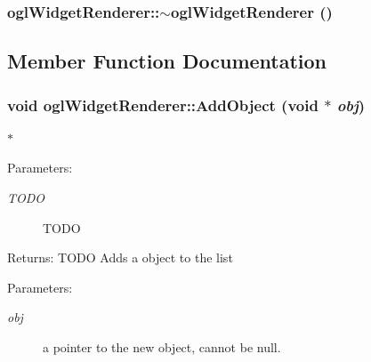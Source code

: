 \hypertarget{classogl_widget_renderer_b4db2e05b4cf4e0f95a93d0795ea33ad}{
\subsubsection[{$\sim$oglWidgetRenderer}]{\setlength{\rightskip}{0pt plus 5cm}oglWidgetRenderer::$\sim$oglWidgetRenderer ()}}
\label{classogl_widget_renderer_b4db2e05b4cf4e0f95a93d0795ea33ad}




\subsection{Member Function Documentation}
\hypertarget{classogl_widget_renderer_c9fcd00dffcc0a44a9bfff90811e586e}{
\subsubsection[{AddObject}]{\setlength{\rightskip}{0pt plus 5cm}void oglWidgetRenderer::AddObject (void $\ast$ {\em obj})}}
\label{classogl_widget_renderer_c9fcd00dffcc0a44a9bfff90811e586e}


$\ast$ \begin{Desc}
\item[Parameters:]
\begin{description}
\item[{\em TODO}]TODO \end{description}
\end{Desc}
\begin{Desc}
\item[Returns:]TODO Adds a object to the list \end{Desc}
\begin{Desc}
\item[Parameters:]
\begin{description}
\item[{\em obj}]a pointer to the new object, cannot be null. \end{description}
\end{Desc}


